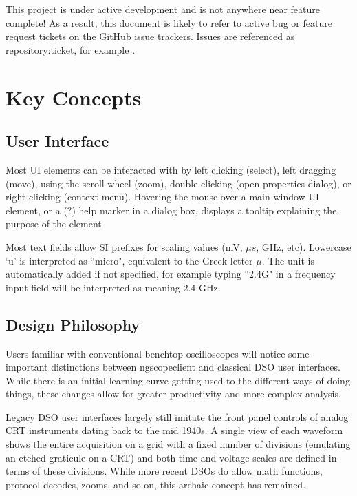 This project is under active development and is not anywhere near feature complete! As a result, this document is
likely to refer to active bug or feature request tickets on the GitHub issue trackers. Issues are referenced as
repository:ticket, for example .

\section{Key Concepts}

\subsection{User Interface}

Most UI elements can be interacted with by left clicking (select), left dragging (move), using the scroll wheel (zoom),
double clicking (open properties dialog), or right clicking (context menu). Hovering the mouse over a main window UI
element, or a (?) help marker in a dialog box, displays a tooltip explaining the purpose of the element


Most text fields allow SI prefixes for scaling values (mV, $\mu s$, GHz, etc). Lowercase `u' is interpreted as
``micro", equivalent to the Greek letter $\mu$. The unit is automatically added if not specified, for example typing
``2.4G" in a frequency input field will be interpreted as meaning 2.4 GHz.

\subsection{Design Philosophy}

Users familiar with conventional benchtop oscilloscopes will notice some important distinctions between ngscopeclient
and classical DSO user interfaces. While there is an initial learning curve getting used to the different ways of doing
things, these changes allow for greater productivity and more complex analysis.

Legacy DSO user interfaces largely still imitate the front panel controls of analog CRT instruments dating back to the
mid 1940s. A single view of each waveform shows the entire acquisition on a grid with a fixed number of divisions
(emulating an etched graticule on a CRT) and both time and voltage scales are defined in terms of these divisions.
While more recent DSOs do allow math functions, protocol decodes, zooms, and so on, this archaic concept has remained.

